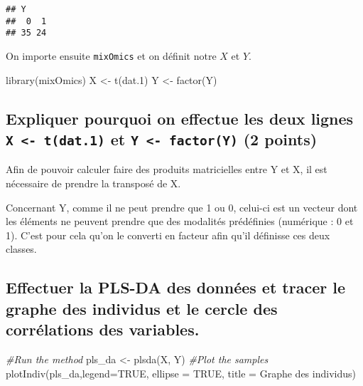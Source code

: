 \documentclass[
]{article}
\newenvironment{Shaded}{\begin{snugshade}}{\end{snugshade}}
\newcommand{\AttributeTok}[1]{\textcolor[rgb]{0.77,0.63,0.00}{#1}}
\newcommand{\CommentTok}[1]{\textcolor[rgb]{0.56,0.35,0.01}{\textit{#1}}}
\newcommand{\ConstantTok}[1]{\textcolor[rgb]{0.00,0.00,0.00}{#1}}
\newcommand{\FloatTok}[1]{\textcolor[rgb]{0.00,0.00,0.81}{#1}}
\newcommand{\FunctionTok}[1]{\textcolor[rgb]{0.00,0.00,0.00}{#1}}
\newcommand{\NormalTok}[1]{#1}
\newcommand{\OtherTok}[1]{\textcolor[rgb]{0.56,0.35,0.01}{#1}}
\newcommand{\StringTok}[1]{\textcolor[rgb]{0.31,0.60,0.02}{#1}}
\begin{document}
\begin{verbatim}
## Y
##  0  1 
## 35 24
\end{verbatim}

On importe ensuite \texttt{mixOmics} et on définit notre \(X\) et \(Y\).

\begin{Shaded}
\begin{Highlighting}[]
\FunctionTok{library}\NormalTok{(mixOmics)}
\NormalTok{X }\OtherTok{\textless{}{-}} \FunctionTok{t}\NormalTok{(dat}\FloatTok{.1}\NormalTok{)}
\NormalTok{Y }\OtherTok{\textless{}{-}} \FunctionTok{factor}\NormalTok{(Y)}
\end{Highlighting}
\end{Shaded}

\hypertarget{expliquer-pourquoi-on-effectue-les-deux-lignes-x---tdat.1-et-y---factory-2-points}{%
\subsection{\texorpdfstring{Expliquer pourquoi on effectue les deux
lignes \texttt{X\ \textless{}-\ t(dat.1)} et
\texttt{Y\ \textless{}-\ factor(Y)} (2
points)}{Expliquer pourquoi on effectue les deux lignes X \textless- t(dat.1) et Y \textless- factor(Y) (2 points)}}\label{expliquer-pourquoi-on-effectue-les-deux-lignes-x---tdat.1-et-y---factory-2-points}}

Afin de pouvoir calculer faire des produits matricielles entre Y et X,
il est nécessaire de prendre la transposé de X.

Concernant Y, comme il ne peut prendre que 1 ou 0, celui-ci est un
vecteur dont les éléments ne peuvent prendre que des modalités
prédéfinies (numérique : 0 et 1). C'est pour cela qu'on le converti en
facteur afin qu'il définisse ces deux classes.

\hypertarget{effectuer-la-pls-da-des-donnuxe9es-et-tracer-le-graphe-des-individus-et-le-cercle-des-corruxe9lations-des-variables.}{%
\subsection{Effectuer la PLS-DA des données et tracer le graphe des
individus et le cercle des corrélations des
variables.}\label{effectuer-la-pls-da-des-donnuxe9es-et-tracer-le-graphe-des-individus-et-le-cercle-des-corruxe9lations-des-variables.}}

\begin{Shaded}
\begin{Highlighting}[]
\CommentTok{\#Run the method}
\NormalTok{pls\_da }\OtherTok{\textless{}{-}} \FunctionTok{plsda}\NormalTok{(X, Y)}
\CommentTok{\#Plot the samples}
\FunctionTok{plotIndiv}\NormalTok{(pls\_da,}\AttributeTok{legend=}\ConstantTok{TRUE}\NormalTok{, }\AttributeTok{ellipse =} \ConstantTok{TRUE}\NormalTok{, }\AttributeTok{title =} \StringTok{\textquotesingle{}Graphe des individus\textquotesingle{}}\NormalTok{)}
\end{Highlighting}
\end{Shaded}
\end{document}
